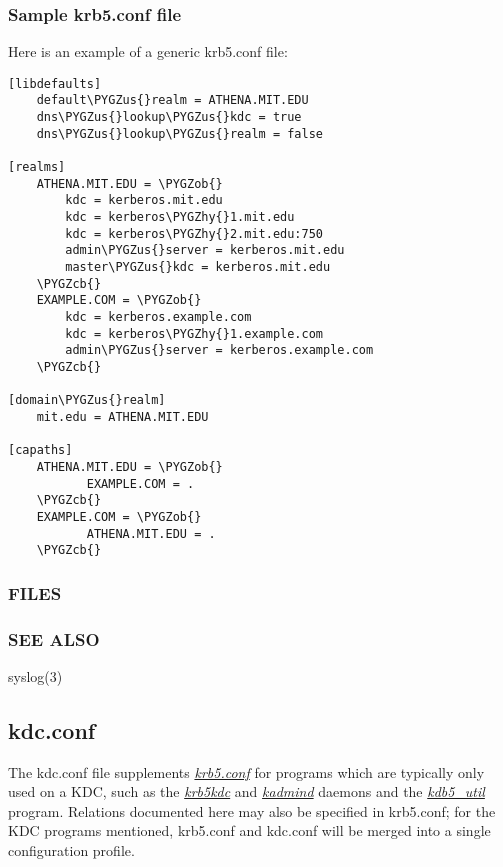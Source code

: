 \documentclass[letterpaper,10pt,english]{sphinxmanual}
\def\PYGZus{\char`\_}
\def\PYGZob{\char`\{}
\def\PYGZcb{\char`\}}
\def\PYGZhy{\char`\-}
\begin{document}
\subsubsection{Sample krb5.conf file}
\label{admin/conf_files/krb5_conf:sample-krb5-conf-file}
Here is an example of a generic krb5.conf file:

\begin{Verbatim}[commandchars=\\\{\}]
[libdefaults]
    default\PYGZus{}realm = ATHENA.MIT.EDU
    dns\PYGZus{}lookup\PYGZus{}kdc = true
    dns\PYGZus{}lookup\PYGZus{}realm = false

[realms]
    ATHENA.MIT.EDU = \PYGZob{}
        kdc = kerberos.mit.edu
        kdc = kerberos\PYGZhy{}1.mit.edu
        kdc = kerberos\PYGZhy{}2.mit.edu:750
        admin\PYGZus{}server = kerberos.mit.edu
        master\PYGZus{}kdc = kerberos.mit.edu
    \PYGZcb{}
    EXAMPLE.COM = \PYGZob{}
        kdc = kerberos.example.com
        kdc = kerberos\PYGZhy{}1.example.com
        admin\PYGZus{}server = kerberos.example.com
    \PYGZcb{}

[domain\PYGZus{}realm]
    mit.edu = ATHENA.MIT.EDU

[capaths]
    ATHENA.MIT.EDU = \PYGZob{}
           EXAMPLE.COM = .
    \PYGZcb{}
    EXAMPLE.COM = \PYGZob{}
           ATHENA.MIT.EDU = .
    \PYGZcb{}
\end{Verbatim}


\subsubsection{FILES}
\label{admin/conf_files/krb5_conf:files}


\subsubsection{SEE ALSO}
\label{admin/conf_files/krb5_conf:see-also}
syslog(3)


\subsection{kdc.conf}
\label{admin/conf_files/kdc_conf:kdc-conf}\label{admin/conf_files/kdc_conf::doc}\label{admin/conf_files/kdc_conf:kdc-conf-5}
The kdc.conf file supplements {\hyperref[admin/conf_files/krb5_conf:krb5-conf-5]{\emph{krb5.conf}}} for programs which
are typically only used on a KDC, such as the {\hyperref[admin/admin_commands/krb5kdc:krb5kdc-8]{\emph{krb5kdc}}} and
{\hyperref[admin/admin_commands/kadmind:kadmind-8]{\emph{kadmind}}} daemons and the {\hyperref[admin/admin_commands/kdb5_util:kdb5-util-8]{\emph{kdb5\_util}}} program.
Relations documented here may also be specified in krb5.conf; for the
KDC programs mentioned, krb5.conf and kdc.conf will be merged into a
single configuration profile.
\end{document}
